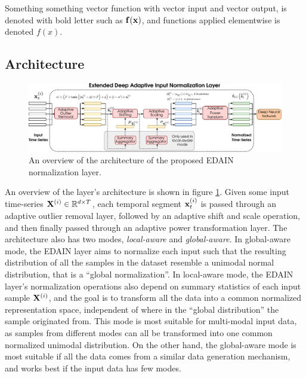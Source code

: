 \documentclass{statsmsc}
\begin{document}
Something something vector function with vector input and vector output, is denoted with bold
letter such as $\mathbf{f}(\mathbf{x})$, and functions applied elementwise is denoted $f(x)$.

\subsection{Architecture}%
\label{sub:Architecture}

\begin{figure}
\begin{center}
    \includegraphics[width=\textwidth]{diagrams/edain-diagram.pdf}
\end{center}
\caption{An overview of the architecture of the proposed \ac{EDAIN} normalization layer.}
\label{fig:edain-arch}
\end{figure}

An overview of the layer's architecture is shown in figure \cref{fig:edain-arch}.
Given some input time-series $\mathbf{X}^{(i)} \in \mathbb{R}^{d \times T}$, each temporal segment
$\mathbf{x}^{(i)}_t$ is passed through an adaptive outlier removal layer, followed by an adaptive shift
and scale operation, and then finally passed through an adaptive power transformation layer.
The architecture also has two modes, \textit{local-aware} and \textit{global-aware}. In
global-aware mode, the \ac{EDAIN} layer aims to normalize each input such that the resulting
distribution of all the samples in the dataset resemble a unimodal normal distribution, that is
a ``global normalization''. In local-aware mode,
the \ac{EDAIN} layer's normalization operations
also depend on summary statistics of each input sample $\mathbf{X}^{(i)}$, and the goal is to transform
all the data into a common normalized representation space, independent of where in the
``global distribution'' the sample originated from. This mode is most suitable for
multi-modal input data, as samples from different modes can all be transformed into one common
normalized unimodal distribution. On the other hand, the global-aware mode
is most suitable if all the data comes from a similar data generation mechanism,
and works best if the input data has few modes.
\end{document}
